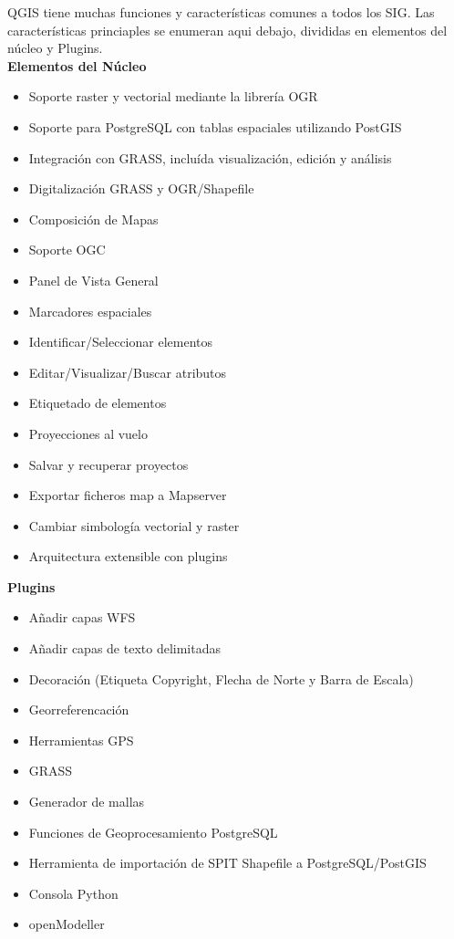 QGIS tiene muchas funciones y características comunes a todos los SIG. 
Las características princiaples se enumeran aqui debajo, divididas en
elementos del núcleo y Plugins. \\

\textbf{Elementos del Núcleo}

\begin{itemize}
\item Soporte raster y vectorial mediante la librería OGR
\item Soporte para PostgreSQL con tablas espaciales utilizando PostGIS
\item Integración con GRASS, incluída visualización, edición y análisis
\item Digitalización GRASS y OGR/Shapefile
\item Composición de Mapas
\item Soporte OGC
\item Panel de Vista General
\item Marcadores espaciales
\item Identificar/Seleccionar elementos
\item Editar/Visualizar/Buscar atributos
\item Etiquetado de elementos
\item Proyecciones al vuelo
\item Salvar y recuperar proyectos
\item Exportar ficheros map a Mapserver
\item Cambiar simbología vectorial y raster 
\item Arquitectura extensible con plugins
\end{itemize}

\textbf{Plugins}

\begin{itemize}
\item Añadir capas WFS
\item Añadir capas de texto delimitadas
\item Decoración (Etiqueta Copyright, Flecha de Norte y Barra de Escala)
\item Georreferencación
\item Herramientas GPS
\item GRASS
\item Generador de mallas
\item Funciones de Geoprocesamiento PostgreSQL
\item Herramienta de importación de SPIT Shapefile a PostgreSQL/PostGIS 
\item Consola Python
\item openModeller
\end{itemize}

